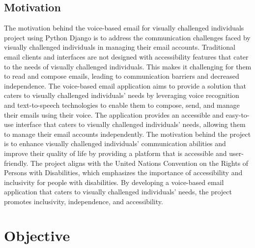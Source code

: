 \documentclass[12pt]{report}
\begin{document}
\subsection{Motivation}
The motivation behind the voice-based email for visually challenged individuals project using Python Django is to address the communication challenges faced by visually challenged individuals in managing their email accounts. Traditional email clients and interfaces are not designed with accessibility features that cater to the needs of visually challenged individuals. This makes it challenging for them to read and compose emails, leading to communication barriers and decreased independence.\newline\newline
The voice-based email application aims to provide a solution that caters to visually challenged individuals' needs by leveraging voice recognition and text-to-speech technologies to enable them to compose, send, and manage their emails using their voice. The application provides an accessible and easy-to-use interface that caters to visually challenged individuals' needs, allowing them to manage their email accounts independently.\newline\newline
The motivation behind the project is to enhance visually challenged individuals' communication abilities and improve their quality of life by providing a platform that is accessible and user-friendly. The project aligns with the United Nations Convention on the Rights of Persons with Disabilities, which emphasizes the importance of accessibility and inclusivity for people with disabilities. By developing a voice-based email application that caters to visually challenged individuals' needs, the project promotes inclusivity, independence, and accessibility.


\section{Objective}
\end{document}
